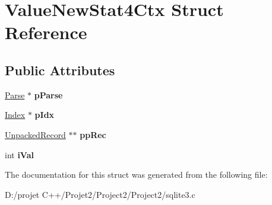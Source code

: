 \hypertarget{struct_value_new_stat4_ctx}{}\section{Value\+New\+Stat4\+Ctx Struct Reference}
\label{struct_value_new_stat4_ctx}
\subsection*{Public Attributes}
\begin{DoxyCompactItemize}
\item 
\mbox{\label{struct_value_new_stat4_ctx_aa1d5c751a45f4e608dbd883179dd2f18}} 
\mbox{\hyperlink{struct_parse}{Parse}} $\ast$ {\bfseries p\+Parse}
\item 
\mbox{\label{struct_value_new_stat4_ctx_a31a0ab3baf8fab451df095591408acad}} 
\mbox{\hyperlink{struct_index}{Index}} $\ast$ {\bfseries p\+Idx}
\item 
\mbox{\label{struct_value_new_stat4_ctx_a64e1490828ea95f9edc650a776a121d9}} 
\mbox{\hyperlink{struct_unpacked_record}{Unpacked\+Record}} $\ast$$\ast$ {\bfseries pp\+Rec}
\item 
\mbox{\label{struct_value_new_stat4_ctx_a54d56872d3653e59a00a91ea1c6b7664}} 
int {\bfseries i\+Val}
\end{DoxyCompactItemize}


The documentation for this struct was generated from the following file\+:\begin{DoxyCompactItemize}
\item 
D\+:/projet C++/\+Projet2/\+Project2/\+Project2/sqlite3.\+c\end{DoxyCompactItemize}
